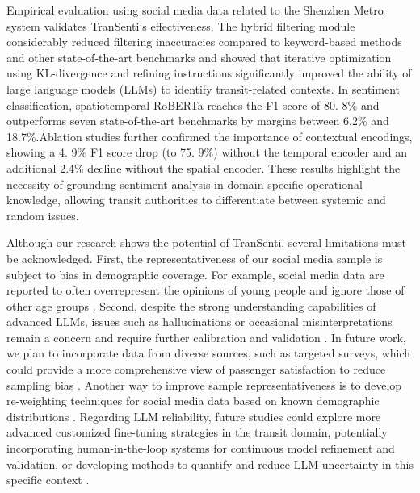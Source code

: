 \documentclass[a4paper,fleqn,12pt]{cas-sc}
\begin{document}
Empirical evaluation using social media data related to the Shenzhen Metro system validates TranSenti's effectiveness. The hybrid filtering module considerably reduced filtering inaccuracies compared to keyword-based methods and other state-of-the-art benchmarks and showed that iterative optimization using KL-divergence and refining instructions significantly improved the ability of large language models (LLMs) to identify transit-related contexts. In sentiment classification, spatiotemporal RoBERTa reaches the F1 score of 80. 8\% and outperforms seven state-of-the-art benchmarks by margins between 6.2\% and 18.7\%.Ablation studies further confirmed the importance of contextual encodings, showing a 4. 9\% F1 score drop (to 75. 9\%) without the temporal encoder and an additional 2.4\% decline without the spatial encoder. These results highlight the necessity of grounding sentiment analysis in domain-specific operational knowledge, allowing transit authorities to differentiate between systemic and random issues.

Although our research shows the potential of TranSenti, several limitations must be acknowledged. First, the representativeness of our social media sample is subject to bias in demographic coverage. For example, social media data are reported to often overrepresent the opinions of young people and ignore those of other age groups \citep{de2017travel, abenoza2017travel}. Second, despite the strong understanding capabilities of advanced LLMs, issues such as hallucinations or occasional misinterpretations remain a concern and require further calibration and validation \citep{yao2023llm}. In future work, we plan to incorporate data from diverse sources, such as targeted surveys, which could provide a more comprehensive view of passenger satisfaction to reduce sampling bias \citep{nikolaidou2018utilizing}. Another way to improve sample representativeness is to develop re-weighting techniques for social media data based on known demographic distributions \citep{cui2021inferring}. Regarding LLM reliability, future studies could explore more advanced customized fine-tuning strategies in the transit domain, potentially incorporating human-in-the-loop systems for continuous model refinement and validation, or developing methods to quantify and reduce LLM uncertainty in this specific context \citep{yang2023human}. 

\end{document}
